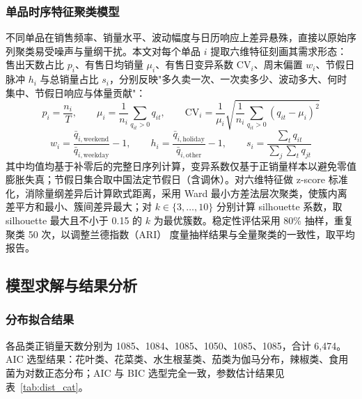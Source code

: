 \subsubsection{单品时序特征聚类模型}

不同单品在销售频率、销量水平、波动幅度与日历响应上差异悬殊，直接以原始序列聚类易受噪声与量纲干扰。本文对每个单品 $i$ 提取六维特征刻画其需求形态\cite{wang2006}：售出天数占比 $p_i$、有售日均销量 $\mu_i$、有售日变异系数 $\mathrm{CV}_i$、周末偏置 $w_i$、节假日脉冲 $h_i$ 与总销量占比 $s_i$，分别反映"多久卖一次、一次卖多少、波动多大、何时集中、节假日响应与体量贡献"：
\begin{equation}\label{eq:feat1}
  p_i=\frac{n_i}{T},\qquad
  \mu_i=\frac{1}{n_i}\sum_{q_{it}>0}q_{it},\qquad
  \mathrm{CV}_i=\frac{1}{\mu_i}\sqrt{\frac{1}{n_i}\sum_{q_{it}>0}(q_{it}-\mu_i)^2}
\end{equation}
\begin{equation}\label{eq:feat2}
  w_i=\frac{\bar q_{i,\mathrm{weekend}}}{\bar q_{i,\mathrm{weekday}}}-1,\qquad
  h_i=\frac{\bar q_{i,\mathrm{holiday}}}{\bar q_{i,\mathrm{other}}}-1,\qquad
  s_i=\frac{\sum_t q_{it}}{\sum_j\sum_t q_{jt}}
\end{equation}
其中均值均基于补零后的完整日序列计算，变异系数仅基于正销量样本以避免零值膨胀失真；节假日集合取中国法定节假日（含调休）。对六维特征做 z-score 标准化，消除量纲差异后计算欧式距离，采用 Ward 最小方差法层次聚类\cite{ward1963,murtagh2014,kaufman1990}，使簇内离差平方和最小、簇间差异最大；对 $k\in\{3,\dots,10\}$ 分别计算 silhouette 系数\cite{rouseeuw1987}，取 silhouette 最大且不小于 0.15 的 $k$ 为最优簇数。稳定性评估采用 80\% 抽样，重复聚类 50 次，以调整兰德指数（ARI）\cite{hubert1985} 度量抽样结果与全量聚类的一致性，取平均报告。

\subsection{模型求解与结果分析}

\subsubsection{分布拟合结果}

各品类正销量天数分别为 1085、1084、1085、1050、1085、1085，合计 6,474。AIC 选型结果：花叶类、花菜类、水生根茎类、茄类为伽马分布，辣椒类、食用菌为对数正态分布；AIC 与 BIC 选型完全一致，参数估计结果见表~\ref{tab:dist_cat}。

